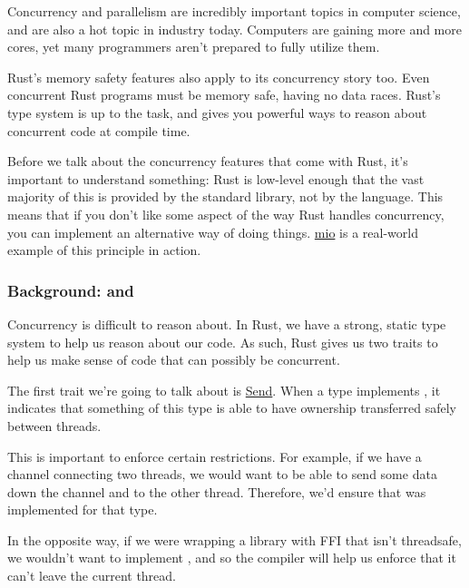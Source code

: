 Concurrency and parallelism are incredibly important topics in computer science, and are also a hot topic in industry today. 
Computers are gaining more and more cores, yet many programmers aren't prepared to fully utilize them.

\blank

Rust's memory safety features also apply to its concurrency story too. Even concurrent Rust programs must be memory safe, having 
no data races. Rust's type system is up to the task, and gives you powerful ways to reason about concurrent code at compile time.

\blank

Before we talk about the concurrency features that come with Rust, it's important to understand something: Rust is low-level enough 
that the vast majority of this is provided by the standard library, not by the language. This means that if you don't like some aspect 
of the way Rust handles concurrency, you can implement an alternative way of doing things. \href{https://github.com/carllerche/mio}{mio} 
is a real-world example of this principle in action.

\subsubsection*{Background:  and }

Concurrency is difficult to reason about. In Rust, we have a strong, static type system to help us reason about our code. As such, 
Rust gives us two traits to help us make sense of code that can possibly be concurrent.


The first trait we're going to talk about is \href{https://doc.rust-lang.org/std/marker/trait.Send.html}{Send}. When a type  
implements , it indicates that something of this type is able to have ownership transferred safely between threads.

\blank

This is important to enforce certain restrictions. For example, if we have a channel connecting two threads, we would want to be 
able to send some data down the channel and to the other thread. Therefore, we'd ensure that  was implemented for that type.

\blank

In the opposite way, if we were wrapping a library with FFI that isn't threadsafe, we wouldn't want to implement , 
and so the compiler will help us enforce that it can't leave the current thread.

